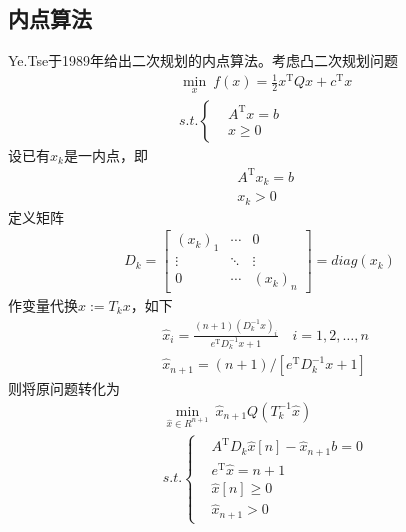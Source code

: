     \subsection{内点算法}
        \par
        Ye.Tse于1989年给出二次规划的内点算法。考虑凸二次规划问题
        \begin{align*}
        & \mathop{\min}\limits_{x} \ f(x) = \frac 12x^\mathrm{T} Qx+c^\mathrm{T} x\\
        & s.t.\left\{
        \begin{aligned}
        &A^\mathrm{T}x=b\\
        &x \geqslant 0
        \end{aligned}
        \right.
        \end{align*}
        设已有$x_k$是一内点，即
        \begin{align*}
             &A^\mathrm{T} x_k=b\\
             &x_k > 0
        \end{align*}
        定义矩阵
        \begin{align*}
        D_k=\begin{bmatrix} (x_k)_1 & \cdots & 0 \\
        \vdots & \ddots & \vdots \\0 & \cdots & (x_k)_n\end{bmatrix} = diag(x_k)
        \end{align*}
        作变量代换$\hat{x}:=T_kx$，如下
        \begin{align*}
        & {\hat{x}}_i=\frac{(n+1)(D_k^{-1}x)_i}{e^\mathrm{T} D_k^{-1}x+1}\quad i=1,2,\ldots,n\\
        & {\hat{x}}_{n+1}=(n+1)/[e^\mathrm{T} D_k^{-1}x+1]
        \end{align*}
        则将原问题转化为
        \begin{align}
        \label{原问题的转化1}
        &\mathop {\min}\limits_{\hat{x}\in R^{n+1}}\  {\hat{x}}_{n+1}Q(T_k^{-1}\hat{x})\\
        &s.t.\left\{
        \begin{aligned}
        &A^\mathrm{T} D_k \hat{x}[n] - \hat{x}_{n+1}b = 0\\
        &e^\mathrm{T}\hat{x} = n+1\\
        &\hat{x}[n] \geqslant 0\\
        &{\hat{x}}_{n+1}>0
        \end{aligned}
        \right.
        \end{align}
